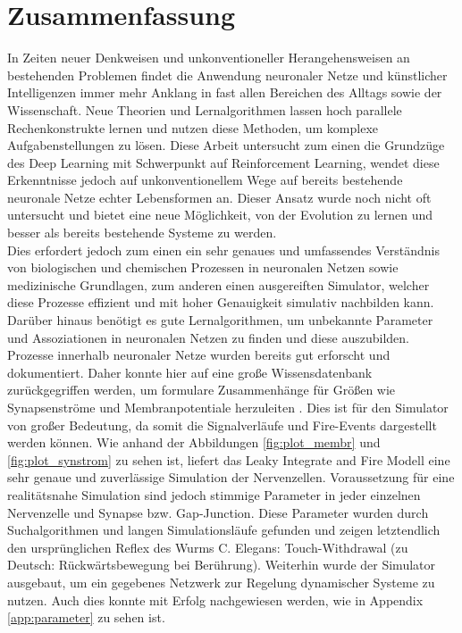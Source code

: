 \section{Zusammenfassung}
\label{sec:erg_zsm}
	In Zeiten neuer Denkweisen und unkonventioneller Herangehensweisen an bestehenden Problemen findet die Anwendung neuronaler Netze und künstlicher Intelligenzen immer mehr Anklang in fast allen Bereichen des Alltags sowie der Wissenschaft. Neue Theorien und Lernalgorithmen lassen hoch parallele Rechenkonstrukte lernen und nutzen diese Methoden, um komplexe Aufgabenstellungen zu lösen. Diese Arbeit untersucht zum einen die Grundzüge des Deep Learning mit Schwerpunkt auf Reinforcement Learning, wendet diese Erkenntnisse jedoch auf unkonventionellem Wege auf bereits bestehende neuronale Netze echter Lebensformen an. Dieser Ansatz wurde noch nicht oft untersucht und bietet eine neue Möglichkeit, von der Evolution zu lernen und besser als bereits bestehende Systeme zu werden.\\
	Dies erfordert jedoch zum einen ein sehr genaues und umfassendes Verständnis von biologischen und chemischen Prozessen in neuronalen Netzen sowie medizinische Grundlagen, zum anderen einen ausgereiften Simulator, welcher diese Prozesse effizient und mit hoher Genauigkeit simulativ nachbilden kann. Darüber hinaus benötigt es gute Lernalgorithmen, um unbekannte Parameter und Assoziationen in neuronalen Netzen zu finden und diese auszubilden.\\
	Prozesse innerhalb neuronaler Netze wurden bereits gut erforscht und dokumentiert. Daher konnte hier auf eine große Wissensdatenbank zurückgegriffen werden, um formulare Zusammenhänge für Größen wie Synapsenströme und Membranpotentiale herzuleiten \cite{NeuronalDynamics}. Dies ist für den Simulator von großer Bedeutung, da somit die Signalverläufe und Fire-Events dargestellt werden können. Wie anhand der Abbildungen \ref{fig:plot_membr} und \ref{fig:plot_synstrom} zu sehen ist, liefert das Leaky Integrate and Fire Modell eine sehr genaue und zuverlässige Simulation der Nervenzellen. Voraussetzung für eine realitätsnahe Simulation sind jedoch stimmige Parameter in jeder einzelnen Nervenzelle und Synapse bzw. Gap-Junction. Diese Parameter wurden durch Suchalgorithmen und langen Simulationsläufe gefunden und zeigen letztendlich den ursprünglichen Reflex des Wurms C. Elegans: Touch-Withdrawal (zu Deutsch: Rückwärtsbewegung bei Berührung). Weiterhin wurde der Simulator ausgebaut, um ein gegebenes Netzwerk zur Regelung dynamischer Systeme zu nutzen. Auch dies konnte mit Erfolg nachgewiesen werden, wie in Appendix \ref{app:parameter} zu sehen ist.\\
